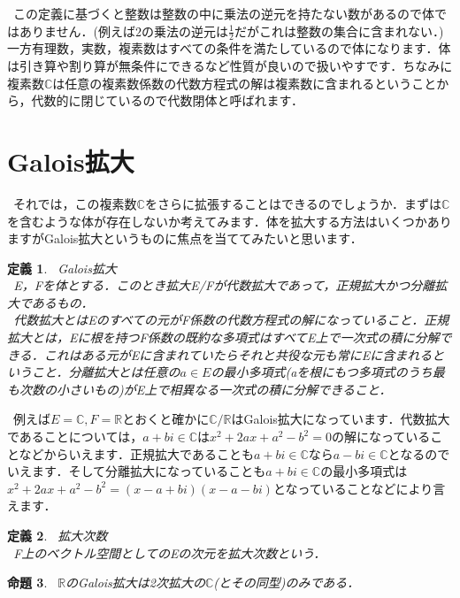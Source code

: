 \documentclass{jreport}
\theoremstyle{idefinition}
\newtheorem{idefi}{定義}[section]
\newtheorem{iprop}[idefi]{命題}
\begin{document}
\ この定義に基づくと整数は整数の中に乗法の逆元を持たない数があるので体ではありません．(例えば$2$の乗法の逆元は$\frac{1}{2}$だがこれは整数の集合に含まれない．)一方有理数，実数，複素数はすべての条件を満たしているので体になります．体は引き算や割り算が無条件にできるなど性質が良いので扱いやすです．ちなみに複素数$\mathbb{C}$は任意の複素数係数の代数方程式の解は複素数に含まれるということから，代数的に閉じているので代数閉体と呼ばれます．\\



\section{Galois拡大}
\ それでは，この複素数$\mathbb{C}$をさらに拡張することはできるのでしょうか．まずは$\mathbb{C}$を含むような体が存在しないか考えてみます．体を拡大する方法はいくつかありますがGalois拡大というものに焦点を当ててみたいと思います．\\

\begin{idefi}
\ Galois拡大\\
\ E，Fを体とする．このとき拡大E/Fが代数拡大であって，正規拡大かつ分離拡大であるもの．\\
\ 代数拡大とはEのすべての元がF係数の代数方程式の解になっていること．正規拡大とは，Eに根を持つF係数の既約な多項式はすべてE上で一次式の積に分解できる．これはある元がEに含まれていたらそれと共役な元も常にEに含まれるということ．分離拡大とは任意の$a \in E$の最小多項式(aを根にもつ多項式のうち最も次数の小さいもの)がE上で相異なる一次式の積に分解できること．
\end{idefi}

\ 例えば$E=\mathbb{C},F=\mathbb{R}$とおくと確かに$\mathbb{C}/\mathbb{R}$はGalois拡大になっています．代数拡大であることについては，$a+bi\in \mathbb{C}$は$x^2+2ax+a^2-b^2=0$の解になっていることなどからいえます．正規拡大であることも$a+bi\in \mathbb{C}$なら$a-bi\in \mathbb{C}$となるのでいえます．そして分離拡大になっていることも$a+bi\in \mathbb{C}$の最小多項式は$x^2+2ax+a^2-b^2=(x-a+bi)(x-a-bi)$となっていることなどにより言えます．\\


\begin{idefi}
\ 拡大次数\\
\ F上のベクトル空間としてのEの次元を拡大次数という．\\
\end{idefi}



\begin{iprop}
\ $\mathbb{R}$のGalois拡大は2次拡大の$\mathbb{C}$(とその同型)のみである．\\
\end{iprop}
\end{document}
